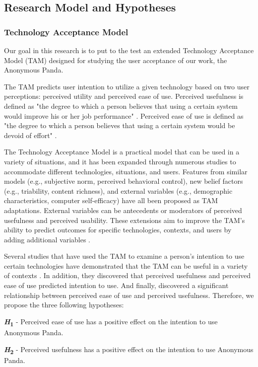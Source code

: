 \subsection{Research Model and Hypotheses}

\subsubsection{Technology Acceptance Model}
Our goal in this research is to put to the test an extended Technology Acceptance Model (TAM) designed for studying the user acceptance of our work, the Anonymous Panda.

The TAM predicts user intention to utilize a given technology based on two user perceptions: perceived utility and perceived ease of use. Perceived usefulness is defined as "the degree to which a person believes that using a certain system would improve his or her job performance" \cite{DAV89}. Perceived ease of use is defined as "the degree to which a person believes that using a certain system would be devoid of effort" \cite{DAV89}.

The Technology Acceptance Model is a practical model that can be used in a variety of situations, and it has been expanded through numerous studies to accommodate different technologies, situations, and users. Features from similar models (e.g., subjective norm, perceived behavioral control), new belief factors (e.g., triability, content richness), and external variables (e.g., demographic characteristics, computer self-efficacy) have all been proposed as TAM adaptations. External variables can be antecedents or moderators of perceived usefulness and perceived usability. These extensions aim to improve the TAM's ability to predict outcomes for specific technologies, contexts, and users by adding additional variables \cite{CAM20}.

Several studies that have used the TAM to examine a person's intention to use certain technologies have demonstrated that the TAM can be useful in a variety of contexts \cite{CAM20}. In addition, they discovered that perceived usefulness and perceived ease of use predicted intention to use. And finally, discovered a significant relationship between perceived ease of use and perceived usefulness. Therefore, we propose the three following hypotheses:

\textbf{\textit{H}\textsubscript{1}} - Perceived ease of use has a positive effect on the intention to use Anonymous Panda.

\textbf{\textit{H}\textsubscript{2}} - Perceived usefulness has a positive effect on the intention to use Anonymous Panda.

